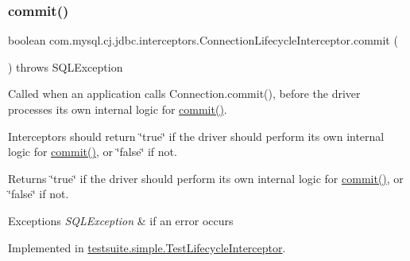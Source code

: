 \mbox{\label{interfacecom_1_1mysql_1_1cj_1_1jdbc_1_1interceptors_1_1_connection_lifecycle_interceptor_a7415bbf8cf6eefbbbd22f710e7f694f9}} 
\subsubsection{\texorpdfstring{commit()}{commit()}}
{\footnotesize\ttfamily boolean com.\+mysql.\+cj.\+jdbc.\+interceptors.\+Connection\+Lifecycle\+Interceptor.\+commit (\begin{DoxyParamCaption}{ }\end{DoxyParamCaption}) throws S\+Q\+L\+Exception}

Called when an application calls Connection.\+commit(), before the driver processes its own internal logic for \mbox{\hyperlink{interfacecom_1_1mysql_1_1cj_1_1jdbc_1_1interceptors_1_1_connection_lifecycle_interceptor_a7415bbf8cf6eefbbbd22f710e7f694f9}{commit()}}.

Interceptors should return \char`\"{}true\char`\"{} if the driver should perform its own internal logic for \mbox{\hyperlink{interfacecom_1_1mysql_1_1cj_1_1jdbc_1_1interceptors_1_1_connection_lifecycle_interceptor_a7415bbf8cf6eefbbbd22f710e7f694f9}{commit()}}, or \char`\"{}false\char`\"{} if not.

\begin{DoxyReturn}{Returns}
\char`\"{}true\char`\"{} if the driver should perform its own internal logic for \mbox{\hyperlink{interfacecom_1_1mysql_1_1cj_1_1jdbc_1_1interceptors_1_1_connection_lifecycle_interceptor_a7415bbf8cf6eefbbbd22f710e7f694f9}{commit()}}, or \char`\"{}false\char`\"{} if not.
\end{DoxyReturn}

\begin{DoxyExceptions}{Exceptions}
{\em S\+Q\+L\+Exception} & if an error occurs \\
\hline
\end{DoxyExceptions}


Implemented in \mbox{\hyperlink{classtestsuite_1_1simple_1_1_test_lifecycle_interceptor_a1c51358948a855403a8953f3d4ba5590}{testsuite.\+simple.\+Test\+Lifecycle\+Interceptor}}.

